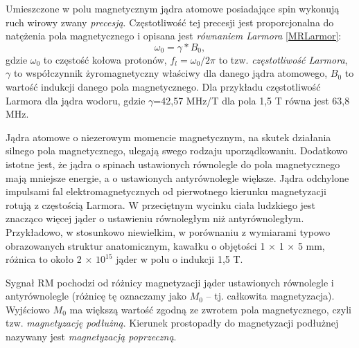 Umieszczone w polu magnetycznym jądra atomowe posiadające spin wykonują ruch wirowy zwany \textit{precesją}. Częstotliwość tej precesji jest proporcjonalna do natężenia pola magnetycznego i opisana jest \textit{równaniem Larmora} \ref{MRLarmor}:
\begin{equation}
\label{MRLarmor}
\omega_0 = \gamma \ast B_0,
\end{equation}
gdzie $\omega_0$ to częstość kołowa protonów, $f_l = \omega_0/2\pi$ to tzw. \textit{częstotliwość Larmora}, $\gamma$ to współczynnik żyromagnetyczny właściwy dla danego jądra atomowego, $B_0$ \linebreak to wartość indukcji danego pola magnetycznego. Dla przykładu częstotliwość Larmora dla jądra wodoru, gdzie $\gamma$=42,57 MHz/T dla pola 1,5 T równa jest 63,8 MHz. 

Jądra atomowe o niezerowym momencie magnetycznym, na skutek działania silnego pola magnetycznego, ulegają swego rodzaju uporządkowaniu. Dodatkowo istotne jest, że jądra o spinach ustawionych równolegle do pola magnetycznego mają mniejsze energie, a o ustawionych antyrównolegle większe. Jądra odchylone impulsami fal elektromagnetycznych od pierwotnego kierunku magnetyzacji rotują \linebreak z częstością Larmora. W przeciętnym wycinku ciała ludzkiego jest znacząco więcej jąder o ustawieniu równoległym niż antyrównoległym. Przykładowo, w stosunkowo niewielkim, w porównaniu z wymiarami typowo obrazowanych struktur anatomicznym, kawałku o objętości 1 $\times$ 1 $\times$ 5 mm, różnica to około 2 $\times$ $10^{15}$ jąder w polu \linebreak o indukcji 1,5 T. 

Sygnał RM pochodzi od różnicy magnetyzacji jąder ustawionych równolegle \linebreak i antyrównolegle (różnicę tę oznaczamy jako $M_0$ -- tj. całkowita magnetyzacja). Wyjściowo $M_0$ ma większą wartość zgodną ze zwrotem pola magnetycznego, czyli tzw. \textit{magnetyzację podłużną}. Kierunek prostopadły do magnetyzacji podłużnej nazywany jest \textit{magnetyzacją poprzeczną}.

